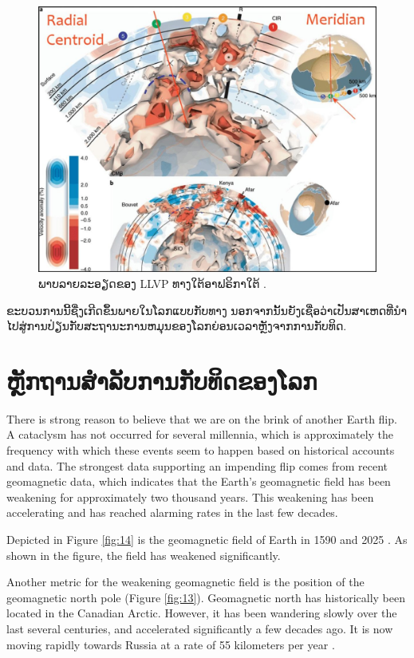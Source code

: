 \documentclass[10pt,twocolumn,letterpaper]{article}
\begin{document}
\begin{figure}[t]
\begin{center}
   \includegraphics[width=1\linewidth]{llvp.jpg}
\end{center}
   \caption{ພາບລາຍລະອຽດຂອງ LLVP ທາງໃຕ້ອາຟຣິກາໃຕ້ \cite{28}.}
\label{fig:12}
\label{fig:onecol}
\end{figure}


ຂະບວນການນີ້ຊື່ງເກີດຂຶ້ນພາຍໃນໂລກແບບກັບທາງ ນອກຈາກນັ້ນຍັງເຊື່ອວ່າເປັນສາເຫດທີ່ນຳໄປສູ່ການປ່ຽນກັບສະຖານະການຫມຸນຂອງໂລກຍ່ອນເວລາຫຼັງຈາກການກັບທິດ.

\section{ຫຼັກຖານສຳລັບການກັບທິດຂອງໂລກ}
There is strong reason to believe that we are on the brink of another Earth flip. A cataclysm has not occurred for several millennia, which is approximately the frequency with which these events seem to happen based on historical accounts and data. The strongest data supporting an impending flip comes from recent geomagnetic data, which indicates that the Earth's geomagnetic field has been weakening for approximately two thousand years. This weakening has been accelerating and has reached alarming rates in the last few decades.

Depicted in Figure \ref{fig:14} is the geomagnetic field of Earth in 1590 and 2025 \cite{125,126}. As shown in the figure, the field has weakened significantly.

Another metric for the weakening geomagnetic field is the position of the geomagnetic north pole (Figure \ref{fig:13}). Geomagnetic north has historically been located in the Canadian Arctic. However, it has been wandering slowly over the last several centuries, and accelerated significantly a few decades ago. It is now moving rapidly towards Russia at a rate of 55 kilometers per year \cite{124}.
\end{document}
